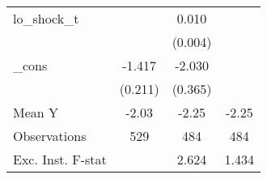 {\begin{tabular}{l*{3}{c}}
\addlinespace
lo\_shock\_t  &                     &       0.010\sym{**} &                     \\
            &                     &     (0.004)         &                     \\
\addlinespace
\_cons      &      -1.417\sym{***}&      -2.030\sym{***}&                     \\
            &     (0.211)         &     (0.365)         &                     \\
\midrule
Mean Y      &       -2.03         &       -2.25         &       -2.25         \\
Observations&         529         &         484         &         484         \\
Exc. Inst. F-stat&                     &       2.624         &       1.434         \\
\bottomrule
\end{tabular}
}
